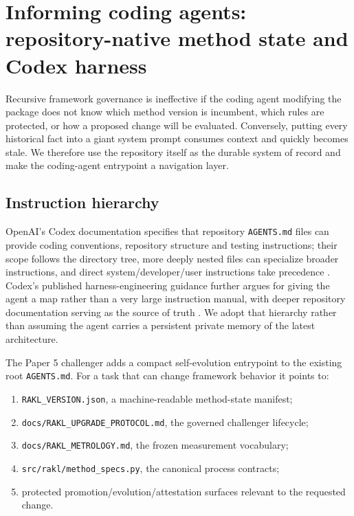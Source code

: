 \section{Informing coding agents: repository-native method state and Codex harness}
\label{sec:codex}

Recursive framework governance is ineffective if the coding agent modifying the package does not know which method version is incumbent, which rules are protected, or how a proposed change will be evaluated. Conversely, putting every historical fact into a giant system prompt consumes context and quickly becomes stale. We therefore use the repository itself as the durable system of record and make the coding-agent entrypoint a navigation layer.

\subsection{Instruction hierarchy}

OpenAI's Codex documentation specifies that repository \texttt{AGENTS.md} files can provide coding conventions, repository structure and testing instructions; their scope follows the directory tree, more deeply nested files can specialize broader instructions, and direct system/developer/user instructions take precedence \cite{openai2025codex}. Codex's published harness-engineering guidance further argues for giving the agent a map rather than a very large instruction manual, with deeper repository documentation serving as the source of truth \cite{openai2026harness}. We adopt that hierarchy rather than assuming the agent carries a persistent private memory of the latest \RAKL{} architecture.

The Paper 5 challenger adds a compact self-evolution entrypoint to the existing root \texttt{AGENTS.md}. For a task that can change framework behavior it points to:

\begin{enumerate}[leftmargin=*]
\item \texttt{RAKL\_VERSION.json}, a machine-readable method-state manifest;
\item \texttt{docs/RAKL\_UPGRADE\_PROTOCOL.md}, the governed challenger lifecycle;
\item \texttt{docs/RAKL\_METROLOGY.md}, the frozen measurement vocabulary;
\item \texttt{src/rakl/method\_specs.py}, the canonical process contracts;
\item protected promotion/evolution/attestation surfaces relevant to the requested change.
\end{enumerate}

